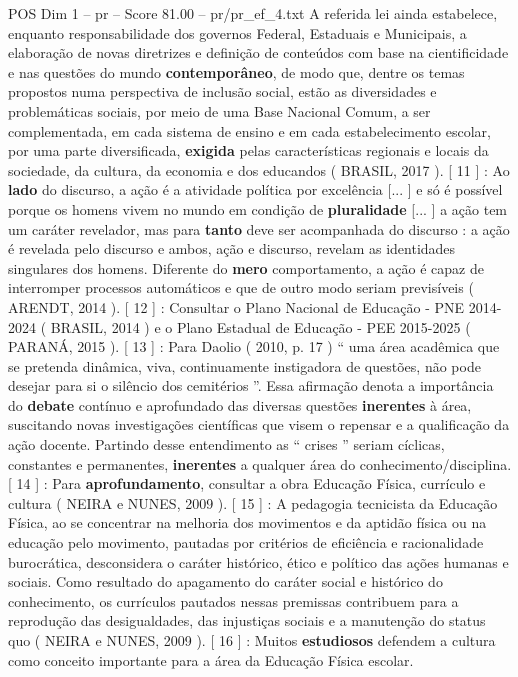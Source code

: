 \begin{textsample}{POS Dim 1 – pr – Score 81.00 – pr/pr\_ef\_4.txt}
A referida lei ainda estabelece, enquanto responsabilidade dos governos Federal, Estaduais e Municipais, a elaboração de novas diretrizes e definição de conteúdos com base na cientificidade e nas questões do mundo \textbf{contemporâneo}, de modo que, dentre os temas propostos numa perspectiva de inclusão social, estão as diversidades e problemáticas sociais, por meio de uma Base Nacional Comum, a ser complementada, em cada sistema de ensino e em cada estabelecimento escolar, por uma parte diversificada, \textbf{exigida} pelas características regionais e locais da sociedade, da cultura, da economia e dos educandos ( BRASIL, 2017 ). [ 11 ] : Ao \textbf{lado} do discurso, a ação é a atividade política por excelência [... ] e só é possível porque os homens vivem no mundo em condição de \textbf{pluralidade} [... ] a ação tem um caráter revelador, mas para \textbf{tanto} deve ser acompanhada do discurso : a ação é revelada pelo discurso e ambos, ação e discurso, revelam as identidades singulares dos homens.
Diferente do \textbf{mero} comportamento, a ação é capaz de interromper processos automáticos e que de outro modo seriam previsíveis ( ARENDT, 2014 ). [ 12 ] : Consultar o Plano Nacional de Educação - PNE 2014-2024 ( BRASIL, 2014 ) e o Plano Estadual de Educação - PEE 2015-2025 ( PARANÁ, 2015 ). [ 13 ] : Para Daolio ( 2010, p. 17 ) “ uma área acadêmica que se pretenda dinâmica, viva, continuamente instigadora de questões, não pode desejar para si o silêncio dos cemitérios ”.
Essa afirmação denota a importância do \textbf{debate} contínuo e aprofundado das diversas questões \textbf{inerentes} à área, suscitando novas investigações científicas que visem o repensar e a qualificação da ação docente.
Partindo desse entendimento as “ crises ” seriam cíclicas, constantes e permanentes, \textbf{inerentes} a qualquer área do conhecimento/disciplina. [ 14 ] : Para \textbf{aprofundamento}, consultar a obra Educação Física, currículo e cultura ( NEIRA e NUNES, 2009 ). [ 15 ] : A pedagogia tecnicista da Educação Física, ao se concentrar na melhoria dos movimentos e da aptidão física ou na educação pelo movimento, pautadas por critérios de eficiência e racionalidade burocrática, desconsidera o caráter histórico, ético e político das ações humanas e sociais.
Como resultado do apagamento do caráter social e histórico do conhecimento, os currículos pautados nessas premissas contribuem para a reprodução das desigualdades, das injustiças sociais e a manutenção do status quo ( NEIRA e NUNES, 2009 ). [ 16 ] : Muitos \textbf{estudiosos} defendem a cultura como conceito importante para a área da Educação Física escolar.

\end{textsample}
